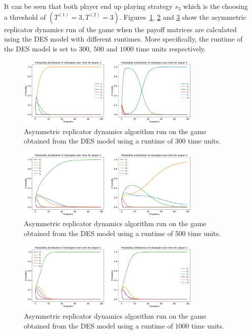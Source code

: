 It can be seen that both player end up playing strategy \(s_3\) which is the
choosing a threshold of \((T^{(1)} = 3, T^{(2)} = 3)\).
Figures~\ref{fig:game_des_runtime_300}, \ref{fig:game_des_runtime_500} and
\ref{fig:game_des_runtime_1000} show the asymmetric replicator dynamics run of
the game when the payoff matrices are calculated using the DES model with
different runtimes.
More specifically, the runtime of the DES model is set to \(300\), \(500\) and
\(1000\) time units respectively.

\begin{figure}[H]
    \centering
    \includegraphics[width=0.8\textwidth]{chapters/06_agent_based_extension/Bin/game_model_with_des/game_simulation_300.pdf}
    \caption{Asymmetric replicator dynamics algorithm run on the game obtained
    from the DES model using a runtime of \(300\) time units.}
    \label{fig:game_des_runtime_300}
\end{figure}

\begin{figure}[H]
    \centering
    \includegraphics[width=0.8\textwidth]{chapters/06_agent_based_extension/Bin/game_model_with_des/game_simulation_500.pdf}
    \caption{Asymmetric replicator dynamics algorithm run on the game obtained
    from the DES model using a runtime of \(500\) time units.}
    \label{fig:game_des_runtime_500}
\end{figure}

\begin{figure}[H]
    \centering
    \includegraphics[width=0.8\textwidth]{chapters/06_agent_based_extension/Bin/game_model_with_des/game_simulation_1000.pdf}
    \caption{Asymmetric replicator dynamics algorithm run on the game obtained
    from the DES model using a runtime of \(1000\) time units.}
    \label{fig:game_des_runtime_1000}
\end{figure}

